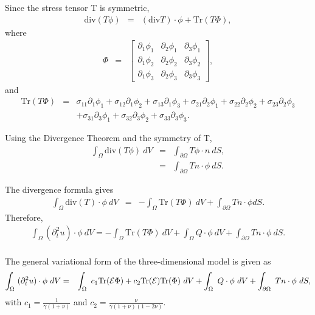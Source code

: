 \documentclass[../../main.tex]{subfiles}
\begin{document}
Since the stress tensor T is symmetric, 
\begin{eqnarray*}
	\textrm{div}(T\phi) & = & (\textrm{div}T)\cdot \phi + \textrm{Tr}(T\Phi),
\end{eqnarray*}
where
\begin{eqnarray*}
	\Phi & = &
	\begin{bmatrix}
		\partial_1 \phi_1 & \partial_2 \phi_1 & \partial_3 \phi_1 \\
		\partial_1 \phi_2 & \partial_2 \phi_2 & \partial_3 \phi_2 \\
		\partial_1 \phi_3 & \partial_2 \phi_3 & \partial_3 \phi_3
	\end{bmatrix},
\end{eqnarray*}
and 
\begin{eqnarray*}
	\textrm{Tr}(T\Phi) & = & \sigma_{11} \partial_1\phi_1 + \sigma_{12}\partial_1 \phi_2 + \sigma_{13}\partial_1 \phi_3 + \sigma_{21}\partial_2 \phi_1 + \sigma_{22}\partial_2\phi_2 + \sigma_{23}\partial_2 \phi_3 \nonumber \\
	& & + \sigma_{31}\partial_3 \phi_1 + \sigma_{32}\partial_3\phi_2 + \sigma_{33}\partial_3 \phi_3.
	\label{Trc}
\end{eqnarray*}

Using the Divergence Theorem and the symmetry of T,
\begin{eqnarray*}
	\int_{\Omega} \textrm{div}(T\phi) \ dV & = & \int_{\partial \Omega} T\phi \cdot n \ dS,\\
	& = & \int_{\partial \Omega} Tn \cdot \phi \ dS.
\end{eqnarray*}

The divergence formula gives
\begin{eqnarray*}
	\int_{\Omega} \textrm{div}(T)\cdot \phi \ dV & = & -\int_{\Omega} \textrm{Tr}(T\Phi) \ dV + \int_{\partial \Omega} Tn\cdot \phi dS.
\end{eqnarray*}
Therefore,
\begin{align*}
	\int_{\Omega} (\partial_t^2 u)\cdot \phi \ dV = -\int_{\Omega} \textrm{Tr}(T\Phi) \ dV  + \int_{\Omega} Q\cdot\phi \ dV + \int_{\partial \Omega} Tn\cdot \phi \ dS.
\end{align*}
\\


The general variational form of the three-dimensional model is given as
\begin{eqnarray*}
	\int_\Omega~ (\partial^2_t u) \cdot \phi~dV & = & \int_\Omega~c_1\textrm{Tr}({\cal E}\Phi)+ c_2\textrm{Tr}({\cal E})
	\textrm{Tr}(\Phi) ~dV + \int_\Omega~ Q \cdot \phi~dV
	+ \int_{\partial \Omega}~Tn \cdot \phi~dS,
\end{eqnarray*}
with $ \displaystyle c_1 = \frac{1}{\gamma(1+\nu)}$ and $\displaystyle c_2 = \frac{\nu}{\gamma(1+\nu)(1-2\nu)}$.\\
\end{document}
